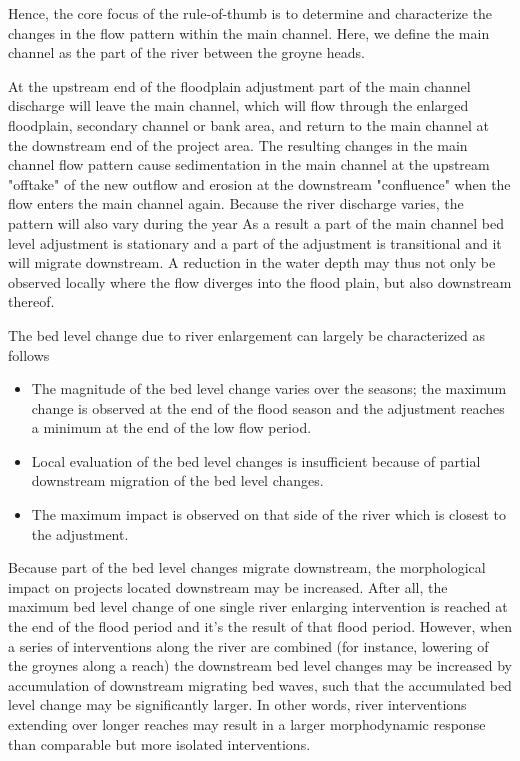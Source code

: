 Hence, the core focus of the rule-of-thumb is to determine and characterize the changes in the flow pattern within the main channel.
Here, we define the main channel as the part of the river between the groyne heads.

At the upstream end of the floodplain adjustment part of the main channel discharge will leave the main channel, which will flow through the enlarged floodplain, secondary channel or bank area, and return to the main channel at the downstream end of the project area.
The resulting changes in the main channel flow pattern cause sedimentation in the main channel at the upstream "offtake" of the new outflow and erosion at the downstream "confluence" when the flow enters the main channel again.
Because the river discharge varies, the pattern will also vary during the year
As a result a part of the main channel bed level adjustment is stationary and a part of the adjustment is transitional and it will migrate downstream.
A reduction in the water depth may thus not only be observed locally where the flow diverges into the flood plain, but also downstream thereof.

The bed level change due to river enlargement can largely be characterized as follows

\begin{itemize}
\item The magnitude of the bed level change varies over the seasons; the maximum change is observed at the end of the flood season and the adjustment reaches a minimum at the end of the low flow period.

\item Local evaluation of the bed level changes is insufficient because of partial downstream migration of the bed level changes.

\item The maximum impact is observed on that side of the river which is closest to the adjustment.
\end{itemize}

Because part of the bed level changes migrate downstream, the morphological impact on projects located downstream may be increased.
After all, the maximum bed level change of one single river enlarging intervention is reached at the end of the flood period and it's the result of that flood period.
However, when a series of interventions along the river are combined (for instance, lowering of the groynes along a reach) the downstream bed level changes may be increased by accumulation of downstream migrating bed waves, such that the accumulated bed level change may be significantly larger.
In other words, river interventions extending over longer reaches may result in a larger morphodynamic response than comparable but more isolated interventions.

